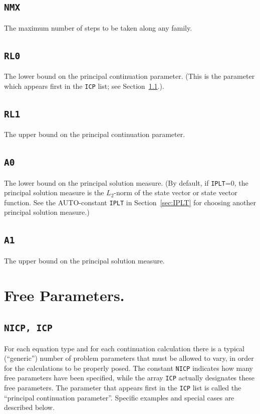 \documentclass[12pt]{report}
\begin{document}
\subsection{\tt NMX} \label{sec:NMX}
The maximum number of steps to be taken along any family.

\subsection{\tt RL0}  \label{sec:RL0}
 The lower bound on the principal continuation parameter.
 (This is the parameter which appears first in the {\tt ICP} list;
 see Section~\ref{sec:ICP}.). 


\subsection{\tt RL1}  \label{sec:RL1}
 The upper bound on the principal continuation parameter. 

\subsection{\tt A0}  \label{sec:A0}
 The lower bound on the principal solution measure.
 (By default, if {\tt IPLT}=0, the principal solution measure
 is the $L_2$-norm of the state vector or state vector function.
 See the {\cal AUTO}-constant {\tt IPLT} in Section~\ref{sec:IPLT} 
 for choosing another principal solution measure.)

\subsection{\tt A1}  \label{sec:A1}
 The upper bound on the principal solution measure.

\section{ Free Parameters.} \label{sec:Free_parameters}


\subsection{\tt NICP, ICP}  \label{sec:ICP}
For each equation type and for each continuation calculation there is
a typical (``generic'') number of problem parameters that must be 
allowed to vary, in order for the calculations to be properly posed.
The constant {\tt NICP} indicates how many free parameters have been specified,
while the array {\tt ICP} actually designates these free parameters.
The parameter that appears first in the {\tt ICP} list is called the 
``principal continuation parameter''.
Specific examples and special cases are described below.
\end{document}
